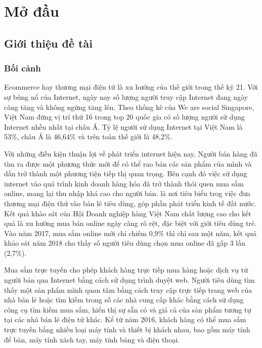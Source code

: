 \chapter{Mở đầu}
\section{Giới thiệu đề tài}
\subsection{Bối cảnh}
\par \hspace{\parindent} Ecommerce hay thương mại điện tử là xu hướng của thế giới trong thế kỷ 21. Với sự bùng nổ của Internet, ngày nay số lượng người truy cập Internet đang ngày càng tăng và không ngừng tăng lên. Theo thống kê của We are social Singapore, Việt Nam đứng vị trí thứ 16 trong top 20 quốc gia có số lượng người sử dụng Internet nhều nhất tại châu Á. Tỷ lệ người sử dụng Internet tại Việt Nam là 53\%, châu Á là 46,64\% và trên toàn thế giới là 48,2\%. \\ \par

Với những điều kiện thuận lợi về phát triển internet hiện nay, Người bán hàng đã tìm ra được một phương thức mới để có thể rao bán các sản phẩm của mình và dần trở thành một phương tiện tiếp thị quan trọng. Bên cạnh đó việc sử dụng internet vào quá trình kinh doanh hàng hóa đã trở thành thói quen mua sắm online, mang lại thu nhập khá cao cho người bán. là nơi tiêu biểu trog việc đưa thương mại điện thử vào bán lẻ tiêu dùng, góp phần phát triển kinh tế đất nước.
Kết quả khảo sát của Hội Doanh nghiệp hàng Việt Nam chất lượng cao cho kết quả là xu hướng mua bán online ngày càng rõ rệt, đặc biệt với giới tiêu dùng trẻ. Vào năm 2017, mua sắm online mới chỉ chiếm 0,9\% thì chỉ sau một năm, kết quả khảo sát năm 2018 cho thấy số người tiêu dùng chọn mua online đã gấp 3 lần (2,7\%).\\ \par

Mua sắm trực tuyến cho phép khách hàng trực tiếp mua hàng hoặc dịch vụ từ người bán qua Internet bằng cách sử dụng trình duyệt web. Người tiêu dùng tìm thấy một sản phẩm mình quan tâm bằng cách truy cập trực tiếp trang web của nhà bán lẻ hoặc tìm kiếm trong số các nhà cung cấp khác bằng cách sử dụng công cụ tìm kiếm mua sắm, hiển thị sự sẵn có và giá cả của sản phẩm tương tự tại các nhà bán lẻ điện tử khác. Kể từ năm 2016, khách hàng có thể mua sắm trực tuyến bằng nhiều loại máy tính và thiết bị khách nhau, bao gồm máy tính để bàn, máy tính xách tay, máy tính bảng và điện thoại.\\ \par

